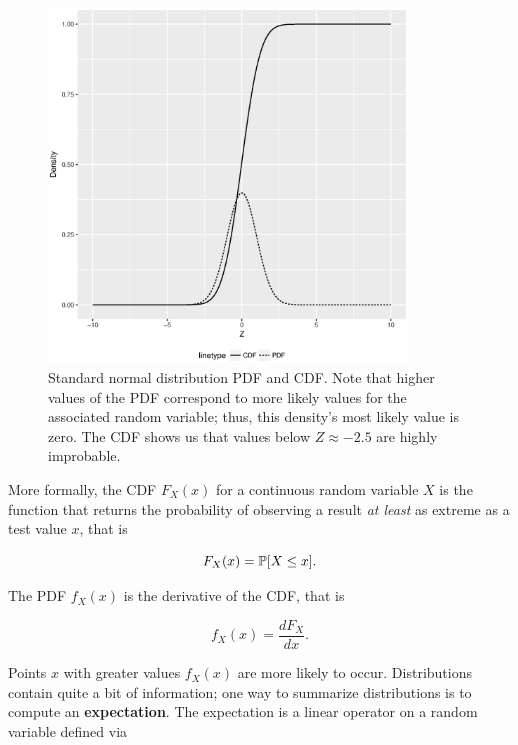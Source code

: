 \documentclass[../primer.tex]{subfiles}
\begin{document}
\begin{figure}[!ht]
  \centering
  \includegraphics[width=0.85\textwidth]{./images/dist_normal}

  \caption{Standard normal distribution PDF and CDF. Note that higher values of
    the PDF correspond to more likely values for the associated random variable;
    thus, this density's most likely value is zero. The CDF shows us that values
    below $Z\approx-2.5$ are highly improbable.}
  \label{fig:dist-norm}
\end{figure}

More formally, the CDF $F_X(x)$ for a continuous random variable $X$ is the
function that returns the probability of observing a result \emph{at least} as
extreme as a test value $x$, that is

\begin{equation} \label{eq:ch3-def-cdf}
  F_X(x) = \P[X \leq x].
\end{equation}

\noindent The PDF $f_X(x)$ is the derivative of the CDF, that is

\begin{equation} \label{eq:ch3-def-pdf}
  f_X(x) = \frac{d F_X}{dx}.
\end{equation}

\noindent Points $x$ with greater values $f_X(x)$ are more likely to occur.
Distributions contain quite a bit of information; one way to summarize
distributions is to compute an \textbf{expectation}. The expectation is a linear
operator on a random variable defined via
\end{document}
